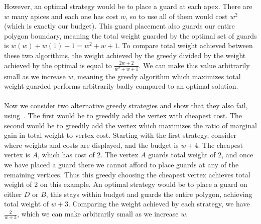 However, an optimal strategy would be to place a guard at each apex. There are $w$ many apices and each one has cost $w$, so to use all of them would cost $w^2$ (which is exactly our budget). This guard placement also guards our entire polygon boundary, meaning the total weight guarded by the optimal set of guards is $w(w)+w(1)+1=w^2+w+1$. To compare total weight achieved between these two algorithms, the weight achieved by the greedy divided by the weight achieved by the optimal is equal to $\frac{2w+2}{w^2+w+1}$. We can make this value arbitrarily small as we increase $w$, meaning the greedy algorithm which maximizes total weight guarded performs arbitrarily badly compared to an optimal solution.\\\\
Now we consider two alternative greedy strategies and show that they also fail, using~. The first would be to greedily add the vertex with cheapest cost. The second would be to greedily add the vertex which maximizes the ratio of marginal gain in total weight to vertex cost. Starting with the first strategy, consider~ where weights and costs are displayed, and the budget is $w+4$. The cheapest vertex is $A$, which has cost of $2$. The vertex $A$ guards total weight of $2$, and once we have placed a guard there we cannot afford to place guards at any of the remaining vertices. Thus this greedy choosing the cheapest vertex achieves total weight of $2$ on this example. An optimal strategy would be to place a guard on either $D$ or $B$, this stays within budget and guards the entire polygon, achieving total weight of $w+3$. Comparing the weight achieved by each strategy, we have $\frac{2}{w+3}$, which we can make arbitrarily small as we increase $w$.
